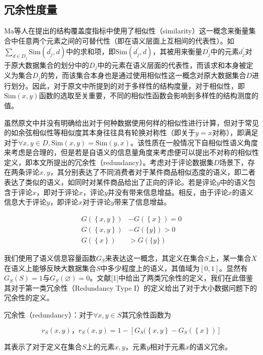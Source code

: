\documentclass{../notes}
\newcommand{\Sim}{\text{Sim}}
\begin{document}
    \subsection{冗余性度量}

    Ma等人在提出的结构覆盖度指标中使用了相似性（similarity）这一概念来衡量集合中任意两个元素之间的可替代性（即在语义层面上互相间的代表性）。如$\sum_{d\in D_j}{\Sim(d_j^\prime,d)}$中的求和项，即$\Sim(d_j^\prime,d)$，其被用来衡量$D_j^\prime$中的元素$d_j^\prime$对于原大数据集合的划分中的$D_j$中的元素在语义层面的代表性，而该求和本身被定义为集合$D_j$的势，而该集合本身也是通过使用相似性这一概念对原大数据集合$D$进行划分。因此，对于原文中所提到的对于多样性的结构度量，对于相似性，即$\Sim(x,y)$函数的选取至关重要，不同的相似性函数会影响到多样性的结构测度的值。

    虽然原文中并没有明确给出对于何种数据使用何样的相似性进行计算，但对于常见的如余弦相似性等相似度其本身往往具有轮换对称性（即关于$y=x$对称），即满足对于$\forall x,y\in D, \Sim\left(x,y\right)=\Sim(y,x)$。该性质在一般情况下自相似性语义角度来考虑是合理的，但是若是自语义的信息量角度来考虑便可以提出不对称的相似性定义，即本文所提出的冗余性（redundancy）。考虑对于评论数据集$D$场景下，存在两条评论$x,y$，其分别表达了不同消费者对于某件商品相似态度的语义，即二者表达了类似的语义，如同时对某件商品给出了正向的评论。若是评论$y$中的语义包含于评论$x$，即对于评论$x$，评论$y$并没有带来信息增益。相反，由于评论$x$的语义信息大于评论$y$，即评论$x$对于评论$y$带来了信息增益。

    \begin{align}
        G\left(\left\{x,y\right\}\right)&-G\left(\left\{x\right\}\right)=0 \\
        G\left(\left\{x,y\right\}\right)&-G\left(\{y\}\right)>0 \\
        G\left(\left\{x\right\}\right)&>G(\{y\})
    \end{align}

    我们使用了语义信息容量函数$G_S$来表达这一概念，其定义在集合$S$上，某一集合$X$在语义上能够反映大数据集合$S$中多少程度上的语义，其值域为$[0,1]$。显然有$G_S\left(S\right)=1$与$G_S\left(\varnothing\right)=0$。文献[1]中给出了两类冗余性的定义，我们在此借鉴其对于第一类冗余性（Redundancy Type I）的定义给出了对于大小数据问题下的冗余性的定义。

    \begin{definition}
        冗余性（redundancy）：对于$\forall x,y\in S$其冗余性函数为

        \begin{equation}
            r_S(x,y)，r_S\left(x,y\right)=1-[G_S(\left\{x,y\right\}-G_S\left(\left\{x\right\}\right)]
        \end{equation}

        其表示了对于定义在集合$S$上的元素$x,y$，元素$y$相对于元素$x$的语义冗余。
    \end{definition}
\end{document}
